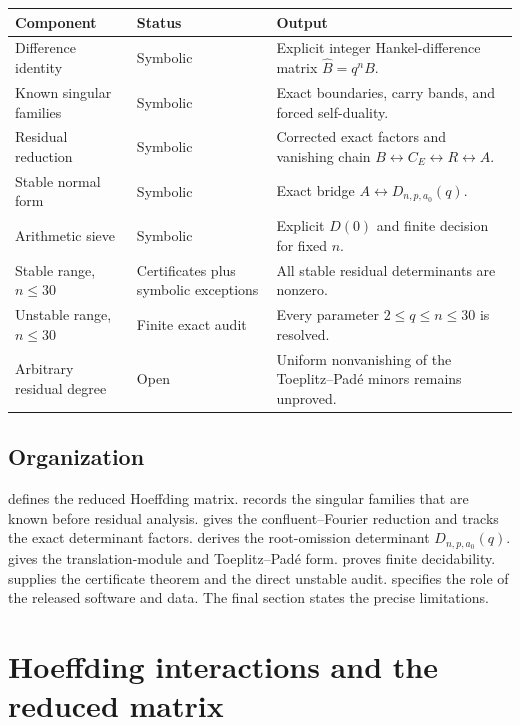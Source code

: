 \documentclass[11pt]{amsart}
\newcommand{\cB}{\widehat B}
\newcommand{\1}{\mathbf 1}
\theoremstyle{remark}
\begin{document}
\begin{center}
\small
\begin{tabularx}{\textwidth}{@{}>{\raggedright\arraybackslash}p{}>{\raggedright\arraybackslash}p{}X@{}}
\toprule
Component & Status & Output \\
\midrule
Difference identity & Symbolic & Explicit integer Hankel-difference matrix $\cB=q^nB$.\\
Known singular families & Symbolic & Exact boundaries, carry bands, and forced self-duality.\\
Residual reduction & Symbolic & Corrected exact factors and vanishing chain $B\leftrightarrow C_E\leftrightarrow R\leftrightarrow A$.\\
Stable normal form & Symbolic & Exact bridge $A\leftrightarrow D_{n,p,a_0}(q)$.\\
Arithmetic sieve & Symbolic & Explicit $D(0)$ and finite decision for fixed $n$.\\
Stable range, $n\le30$ & Certificates plus symbolic exceptions & All stable residual determinants are nonzero.\\
Unstable range, $n\le30$ & Finite exact audit & Every parameter $2\le q\le n\le30$ is resolved.\\
Arbitrary residual degree & Open & Uniform nonvanishing of the Toeplitz--Pad\'e minors remains unproved.\\
\bottomrule
\end{tabularx}
\end{center}

\subsection{Organization}
 defines the reduced Hoeffding matrix.  records the singular families that are known before residual analysis.  gives the confluent--Fourier reduction and tracks the exact determinant factors.  derives the root-omission determinant $D_{n,p,a_0}(q)$.  gives the translation-module and Toeplitz--Pad\'e form.  proves finite decidability.  supplies the certificate theorem and the direct unstable audit.  specifies the role of the released software and data. The final section states the precise limitations.

\section{Hoeffding interactions and the reduced matrix}
\label{sec:matrix}
\end{document}
